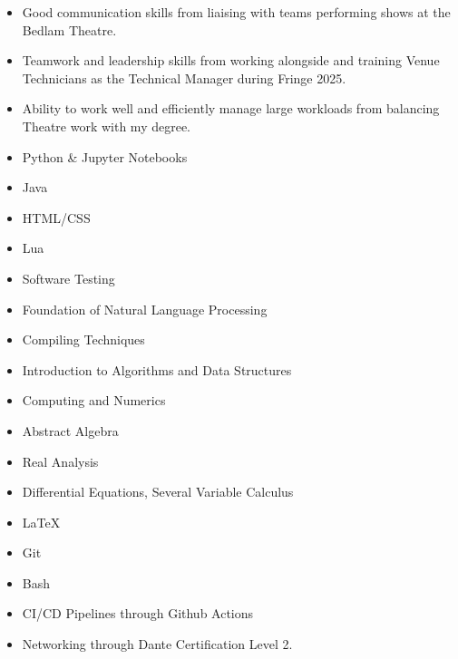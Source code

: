 \documentclass[../../cv-cs.tex]{subfiles}
\begin{document}
\begin{itemize}
	\item Good communication skills from liaising with teams performing shows at the Bedlam Theatre.
	\item Teamwork and leadership skills from working alongside and training Venue Technicians as the Technical Manager during Fringe 2025.
	\item Ability to work well and efficiently manage large workloads from balancing Theatre work with my degree. 
\end{itemize}

\begin{itemize}
	\item Python \& Jupyter Notebooks
	\item Java
	\item HTML/CSS
	\item Lua
\end{itemize}

\begin{itemize}
	\item Software Testing
	\item Foundation of Natural Language Processing
	\item Compiling Techniques
	\item Introduction to Algorithms and Data Structures
	\item Computing and Numerics
\end{itemize}

\begin{itemize}
	\item Abstract Algebra
	\item Real Analysis
	\item Differential Equations, Several Variable Calculus
\end{itemize}

\begin{itemize}
	\item LaTeX
	\item Git
	\item Bash
	\item CI/CD Pipelines through Github \newline Actions 
	\item Networking through Dante Certification Level 2.
\end{itemize}
\end{document}
